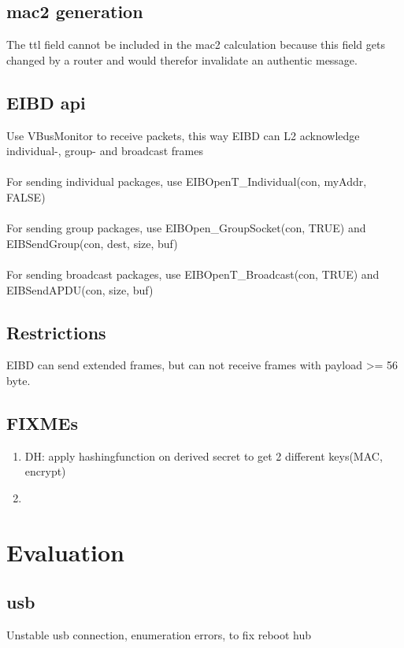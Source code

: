 \subsection{\gls{mac2} generation}

The \gls{ttl} field cannot be included in the \gls{mac2} calculation because this field gets changed by a router and would therefor invalidate an authentic message.

\subsection{EIBD \gls{api}}

Use VBusMonitor to receive packets, this way EIBD can L2 acknowledge individual-, group- and broadcast frames
\\
\\
For sending individual packages, use EIBOpenT\_Individual(con, myAddr, FALSE)
\\
\\
For sending group packages, use EIBOpen\_GroupSocket(con, TRUE) and EIBSendGroup(con, dest, size, buf)
\\
\\
For sending broadcast packages, use EIBOpenT\_Broadcast(con, TRUE) and EIBSendAPDU(con, size, buf)

\subsection{Restrictions }

EIBD can send extended frames, but can not receive frames with payload >= 56 byte. 

\subsection{FIXMEs}

\begin{enumerate}
 \item DH: apply hashingfunction on derived secret to get 2 different keys(MAC, encrypt)
 \item 
\end{enumerate}



\section{Evaluation}

\subsection{\gls{usb}}
Unstable \gls{usb} connection, enumeration errors, to fix reboot hub

